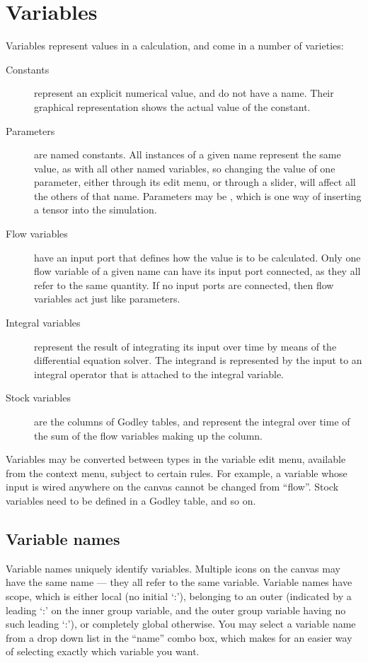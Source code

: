 \section{Variables}\label{Variable:constant}\label{VarConstant}\label{Variable:parameter}
\label{Variable:flow}\label{Variable:integral}\label{Variable:stock}

Variables represent values in a calculation, and come in a number of
varieties:
\begin{description}
\item[Constants] represent an explicit numerical value, and do not
have a name. Their graphical representation shows the actual value of
the constant.
\item[Parameters] are named constants. All instances of a given name
  represent the same value, as with all other named variables, so
  changing the value of one parameter, either through its edit menu,
  or through a slider, will affect all the others of that
  name. Parameters may be , which is one way of inserting a tensor into the
  simulation.
\item[Flow variables] have an input port that defines how the value is
to be calculated. Only one flow variable of a given name can have its
input port connected, as they all refer to the same quantity. If no
input ports are connected, then flow variables act just like
parameters.
\item[Integral variables] represent the result of integrating its
input over time  by means of the differential
equation solver. The integrand is represented by the input to an
integral operator that is attached to the integral variable.
\item[Stock variables] are the columns of Godley tables, and represent
the integral over time of the sum of the flow variables making up the
column.
\end{description}

Variables may be converted between types in the variable edit menu,
available from the context menu, subject to certain rules. For example,
a variable whose input is wired anywhere on the canvas cannot be
changed from ``flow''. Stock variables need to be defined in a Godley
table, and so on.

\subsection{Variable names}

Variable names uniquely identify variables. Multiple icons on the
canvas may have the same name --- they all refer to the same
variable. Variable names have scope, which is either local (no initial
`:'), belonging to an outer  (indicated by a leading `:' on the
inner group variable, and the outer group variable having no such
leading `:'), or completely global otherwise. You may select a
variable name from a drop down list in the ``name'' combo box, which
makes for an easier way of selecting exactly which variable you want.

